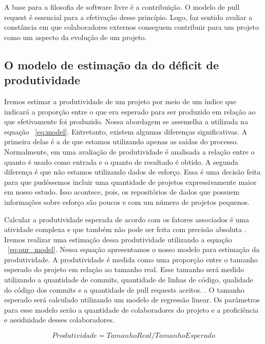 A base para a filosofia de software livre é a contribuição. O modelo de pull request é essencial para a efetivação desse princípio. Logo, faz sentido avaliar a constância em que colaboradores externos conseguem contribuir para um projeto como um aspecto da evolução de um projeto.


\subsection{O modelo de estimação da do déficit de produtividade}

Iremos estimar a produtividade de um projeto por meio de um índice que indicará a proporção entre o que era esperado para ser produzido em relação ao que efetivamente foi produzido. Nossa abordagem se assemelha a utilizada na equação  ~\ref{eq:model}. Entretanto, existem algumas diferenças significativas. A primeira delas é a de que estamos utilizando apenas as saídas do processo.  Normalmente, em uma avaliação de produtividade é analisada a relação entre o quanto é usado como entrada e o quanto de resultado é obtido. A segunda diferença é que não estamos utilizando dados de esforço. Essa é uma decisão feita para que pudéssemos incluir uma quantidade de projetos expressivamente maior em nosso estudo. Isso acontece, pois, os repositórios de dados que possuem informações sobre esforço são poucos e com um número de projetos pequenos. 

Calcular a produtividade esperada de acordo com os fatores associados é uma atividade complexa e que também não pode ser feita com precisão absoluta \cite{petersen2011measuring}. Iremos realizar uma estimação dessa produtividade utilizando  a equação ~\ref{eq:our_model}. Nessa equação apresentamos o nosso modelo para estimação da produtividade. A produtividade é medida como uma proporção entre o tamanho esperado do projeto em relação ao tamanho real. Esse tamanho será medido utilizando a quantidade de commits, quantidade de linhas de código, qualidade do código dos commits e a quantidade de pull requests aceitos.  
. O tamanho esperado será calculado utilizando um modelo de regressão linear. Os parâmetros para esse modelo serão a quantidade de colaboradores do projeto e a proficiência e assiduidade desses colaboradores.

\begin{equation}
\label{eq:our_model}
  Produtividade = TamanhoReal/TamanhoEsperado
\end{equation}



